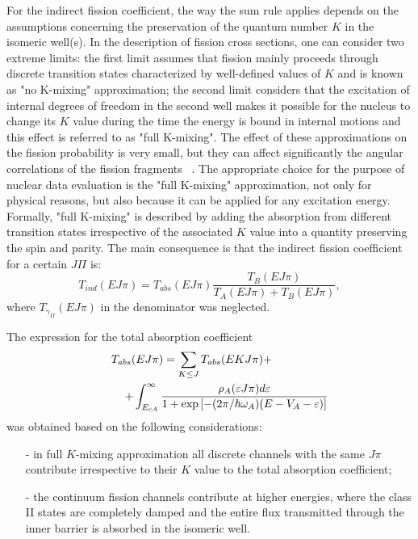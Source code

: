 For the indirect fission coefficient, the way the sum rule applies depends
on the assumptions concerning the preservation of the quantum number $K$ in
the isomeric well(s). In the description of fission cross sections, one can
consider two extreme limits: the first limit assumes that fission mainly
proceeds through discrete transition states characterized by well-defined
values of $K$ and is known as "no K-mixing" approximation; the second limit
considers that the excitation of internal degrees of freedom in the second
well makes it possible for the nucleus to change its $K$ value during the
time the energy is bound in internal motions and this effect is referred to
as "full K-mixing". The effect of these approximations on the fission
probability is very small, but they can affect significantly the angular
correlations of the fission fragments ~\cite{Back:74}. The appropriate
choice for the purpose of nuclear data evaluation is the "full K-mixing"
approximation, not only for physical reasons, but also because it can be
applied for any excitation energy. Formally, "full K-mixing" is described by
adding the absorption from different transition states irrespective of the
associated $K$ value into a quantity preserving the spin and parity. The
main consequence is that the indirect fission coefficient for a certain $%
J\Pi $ is:
\begin{equation}
T_{ind}(E J \pi)=T_{abs}(E J \pi)\frac{T_{B}(E J \pi)}{T_{A}(E J
\pi)+T_{B}(E J \pi)},  \label{tind1}
\end{equation}
where $T_{\gamma_{II}}(E J \pi)$ in the denominator was neglected.

The expression for the total absorption coefficient
\begin{eqnarray}
T_{abs}(EJ\pi)=\sum_{K\le J}T_{abs}(EKJ\pi) +\qquad\qquad\quad  \notag \\
\quad\qquad + \int_{E_{cA}}^{\infty} \frac {\rho_{A}(\varepsilon
J\pi)d\varepsilon} {1+\exp\left[ -(2\pi/\hbar\omega_{A})
(E-V_{A}-\varepsilon)\right] }  \label{tabst}
\end{eqnarray}
was obtained based on the following considerations:

\begin{itemize}
\item[-] in full $K$-mixing approximation all discrete channels with the
same $J\pi$ contribute irrespective to their $K$ value to the total
absorption coefficient;

\item[-] the continuum fission channels contribute at higher energies, where
the class II states are completely damped and the entire flux transmitted
through the inner barrier is absorbed in the isomeric well.
\end{itemize}

